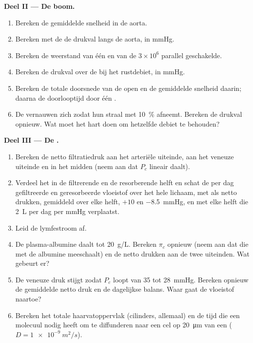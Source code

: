 \begin{problem}
\medskip
\noindent\textbf{Deel II --- De boom.}
\begin{enumerate}[resume]
  \item Bereken de gemiddelde snelheid in de aorta.
  \item Bereken met de  de drukval langs de aorta, in
        mmHg.
  \item Bereken de weerstand van één  en van de $3\times
        10^{6}$ parallel geschakelde.
  \item Bereken de drukval over de  bij het rustdebiet, in mmHg.
  \item Bereken de totale doorsnede van de open  en de gemiddelde
        snelheid daarin; daarna de doorlooptijd door één .
  \item De  vernauwen zich zodat hun straal met \qty{10}{\%}
        afneemt. Bereken de drukval opnieuw. Wat moet het hart doen om
        hetzelfde debiet te behouden?
\end{enumerate}

\medskip
\noindent\textbf{Deel III --- De .}
\begin{enumerate}[resume]
  \item Bereken de netto filtratiedruk aan het arteriële uiteinde, aan het
        veneuze uiteinde en in het midden (neem aan dat $P_c$ lineair
        daalt).
  \item Verdeel het  in de filtrerende en de resorberende helft en
        schat de per dag gefiltreerde en geresorbeerde vloeistof over het
        hele lichaam, met als netto drukken, gemiddeld over elke helft,
        $+10$ en
        \qty{-8.5}{mmHg}, en met elke helft die \qty{2}{L} per dag per mmHg
        verplaatst.
  \item Leid de lymfestroom af.
  \item De plasma-albumine daalt tot \qty{20}{g/L}. Bereken $\pi_c$
        opnieuw (neem aan dat die met de albumine meeschaalt) en de netto
        drukken aan de twee uiteinden. Wat gebeurt er?
  \item De veneuze druk stijgt zodat $P_c$ loopt van 35 tot
        \qty{28}{mmHg}. Bereken opnieuw de gemiddelde netto druk en de
        dagelijkse balans. Waar gaat de vloeistof naartoe?
  \item Bereken het totale haarvatoppervlak (cilinders, allemaal) en de tijd
        die een molecuul nodig heeft om te diffunderen naar een cel op
        \qty{20}{\micro m} van een  ($D = \qty{1e-9}{m^2/s}$).
\end{enumerate}


\end{problem}
